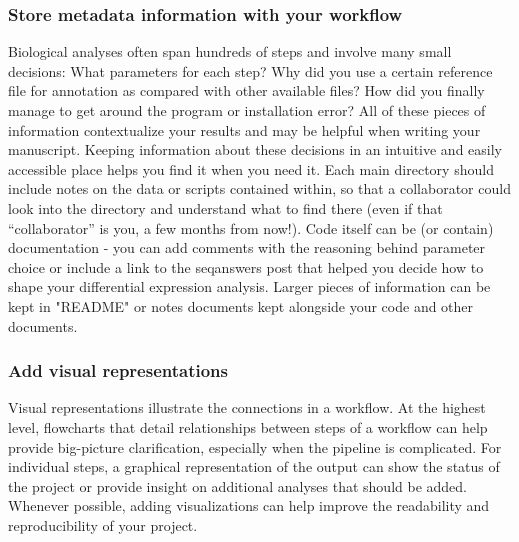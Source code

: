 \documentclass[10pt,letterpaper]{article}
\begin{document}
\subsubsection*{Store metadata information with your workflow} 
Biological analyses often span hundreds of steps and involve many small decisions: What parameters for each step? 
Why did you use a certain reference file for annotation as compared with other available files? 
How did you finally manage to get around the program or installation error? 
All of these pieces of information contextualize your results and may be helpful when writing your manuscript. 
Keeping information about these decisions in an intuitive and easily accessible place helps you find it when you need it. 
Each main directory should include notes on the data or scripts contained within, so that a collaborator could look into the directory and understand what to find there (even if that “collaborator” is you, a few months from now!). 
Code itself can be (or contain) documentation - you can add comments with the reasoning behind parameter choice or include a link to the seqanswers post that helped you decide how to shape your differential expression analysis. 
Larger pieces of information can be kept in "README" or notes documents kept alongside your code and other documents. 

\subsubsection*{Add visual representations} 
Visual representations illustrate the connections in a workflow. 
At the highest level, flowcharts that detail relationships between steps of a workflow can help provide big-picture clarification, especially when the pipeline is complicated. 
For individual steps, a graphical representation of the output can show the status of the project or provide insight on additional analyses that should be added. 
Whenever possible, adding visualizations can help improve the readability and reproducibility of your project.
\end{document}
